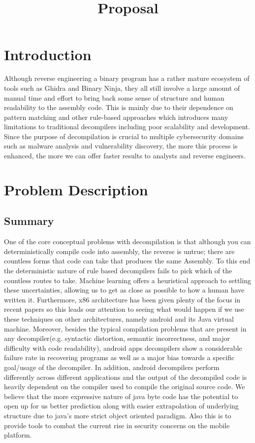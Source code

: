 \documentclass{article}
\author{}
\title{Proposal}
\begin{document}
\maketitle


\section{Introduction}
Although reverse engineering a binary program has a rather mature ecosystem of tools such as Ghidra and Binary Ninja, they all still involve a large amount
of manual time and effort to bring back some sense of structure and human readability to the assembly code. This is mainly due to their dependence on pattern matching and other rule-based approaches which introduces many limitations to traditional decompilers including poor scalability and development.
Since the purpose of decompilation is crucial to multiple cybersecurity domains such as malware analysis and vulnerability discovery, the more this process is enhanced, the more we can offer faster results to analysts and reverse engineers.

\section{Problem Description}
\subsection{Summary}
One of the core conceptual problems with decompilation is that although you can deterministically compile code into assembly, the reverse is untrue; there are countless forms that code can take that produces the same Assembly.
To this end the deterministic nature of rule based decompilers fails to pick which of the countless routes to take.
Machine learning offers a heuristical approach to settling these uncertainties, allowing us to get as close as possible to how a human have written it.
Furthermore, x86 architecture has been given plenty of the focus in recent papers so this leads our attention to seeing what would happen if we use these techniques on other architectures, namely android and its Java virtual machine.
Moreover, besides the typical compilation problems that are present in any decompiler(e.g. syntactic distortion, semantic incorrectness, and major difficulty with code readability), android apps decompilers show a considerable failure rate in recovering programs as well as a major bias towards a specific goal/usage of the decompiler.
In addition, android decompilers perform differently across different applications and the output of the decompiled code is heavily dependent on the compiler used to compile the original source code.
We believe that the more expressive nature of java byte code has the potential to open up for us better prediction along with easier extrapolation of underlying structure due to java’s more strict object oriented paradigm.
Also this is to provide tools to combat the current rise in security concerns on the mobile platform.
\end{document}
